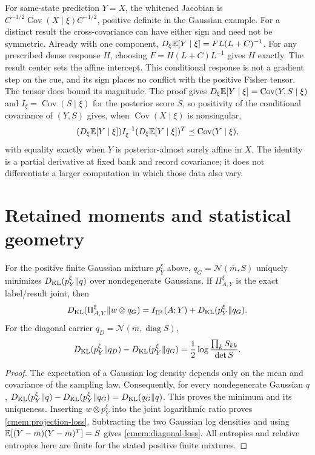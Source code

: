 For same-state prediction $Y=X$, the whitened Jacobian is $C^{-1/2}\operatorname{Cov}(X\mid\xi)C^{-1/2}$, positive definite in the Gaussian example. For a distinct result the cross-covariance can have either sign and need not be symmetric. Already with one component, $D_\xi\mathbb E[Y\mid\xi]=FL(L+C)^{-1}$. For any prescribed dense response $H$, choosing $F=H(L+C)L^{-1}$ gives $H$ exactly. The result center sets the affine intercept. This conditional response is not a gradient step on the cue, and its sign places no conflict with the positive Fisher tensor. The tensor does bound its magnitude. The proof gives $D_\xi\mathbb E[Y\mid\xi]=\operatorname{Cov}(Y,S\mid\xi)$ and $I_\xi=\operatorname{Cov}(S\mid\xi)$ for the posterior score $S$, so positivity of the conditional covariance of $(Y,S)$ gives, when $\operatorname{Cov}(X\mid\xi)$ is nonsingular,
\begin{equation}
 (D_\xi\mathbb E[Y\mid\xi])I_\xi^{-1}(D_\xi\mathbb E[Y\mid\xi])^T\preceq\operatorname{Cov}(Y\mid\xi),
 \label{cmem:response-bound}
\end{equation}
with equality exactly when $Y$ is posterior-almost surely affine in $X$. The identity is a partial derivative at fixed bank and record covariance; it does not differentiate a larger computation in which those data also vary.

\section{Retained moments and statistical geometry}

For the positive finite Gaussian mixture $p_Y^\xi$ above, $q_G=\mathcal N(\bar m,S)$ uniquely minimizes $D_{\mathrm{KL}}(p_Y^\xi\Vert q)$ over nondegenerate Gaussians. If $\Pi_{A,Y}^\xi$ is the exact label/result joint, then
\begin{equation}
 D_{\mathrm{KL}}(\Pi_{A,Y}^\xi\Vert w\otimes q_G)
 =I_{\Pi^\xi}(A;Y)+D_{\mathrm{KL}}(p_Y^\xi\Vert q_G).
 \label{cmem:projection-loss}
\end{equation}
For the diagonal carrier $q_D=\mathcal N(\bar m,\operatorname{diag}S)$,
\begin{equation}
 D_{\mathrm{KL}}(p_Y^\xi\Vert q_D)-D_{\mathrm{KL}}(p_Y^\xi\Vert q_G)
 =\frac12\log\frac{\prod_k S_{kk}}{\det S}.
 \label{cmem:diagonal-loss}
\end{equation}
\begin{proof}
The expectation of a Gaussian log density depends only on the mean and covariance of the sampling law. Consequently, for every nondegenerate Gaussian $q$,
$D_{\mathrm{KL}}(p_Y^\xi\Vert q)-D_{\mathrm{KL}}(p_Y^\xi\Vert q_G)=D_{\mathrm{KL}}(q_G\Vert q)$.
This proves the minimum and its uniqueness. Inserting $w\otimes p_Y^\xi$ into the joint logarithmic ratio proves \cref{cmem:projection-loss}. Subtracting the two Gaussian log densities and using $\mathbb E[(Y-\bar m)(Y-\bar m)^T]=S$ gives \cref{cmem:diagonal-loss}. All entropies and relative entropies here are finite for the stated positive finite mixtures.
\end{proof}

